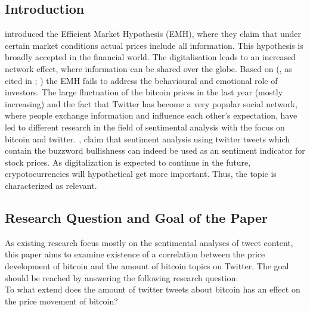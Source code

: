 \documentclass[a4paper,american,12pt]{article}
\begin{document}
\begin{spacing}{1.2}
\cleardoublepage{}
\section{Introduction}
\label{sec:intro}
\textcite[p.~388]{malkiel1970efficient} introduced the Efficient Market Hypothesis (EMH), where they claim that under certain market conditions actual prices include all information. This hypothesis is broadly accepted in the financial world. The digitalisation leads to an increased network effect, where information can be shared over the globe. Based on \citeauthor{mao2015quantifying} (\citeyear[][p.~3]{mao2015quantifying}, as cited in \cite[][pp.~175--195]{shiller2015irrational}; \cite[][pp.~279]{kahneman2013prospect}) the EMH fails to address the behavioural and emotional role of investors. The large fluctuation of the bitcoin prices in the last year (mostly increasing) and the fact that Twitter has become a very popular social network, where people exchange information and influence each other's expectation, have led to different research in the field of sentimental analysis with the focus on bitcoin and twitter. \textcite[p.~18]{mao2015quantifying}, claim that sentiment analysis using twitter tweets which contain the buzzword bullishness can indeed be used as an sentiment indicator for stock prices. As digitalization is expected to continue in the future, crypotocurrencies will hypothetical get more important. Thus, the topic is characterized as relevant.

\subsection{Research Question and Goal of the Paper}
\label{sec:ResearchQandGoal}
As existing research focus mostly on the sentimental analyses of tweet content, this paper aims to examine existence of a correlation between the price development of bitcoin and the amount of bitcoin topics on Twitter. The goal should be reached by answering the following research question: \\
To what extend does the amount of twitter tweets about bitcoin has an effect on the price movement of bitcoin?


\end{spacing}
\end{document}
